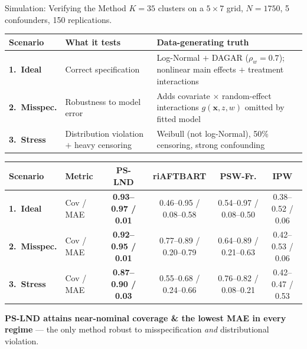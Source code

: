 \documentclass[final]{beamer}
\begin{document}
\begin{frame}[fragile]
\begin{columns}[T]
\begin{column}{0.355\textwidth}
\vspace{4pt}

\begin{methodbox}{Simulation: Verifying the Method}
$K\!=\!35$ clusters on a $5\!\times\!7$ grid, $N\!=\!1750$, 5 confounders, 150 replications.

\vspace{3pt}
\begin{tabularx}{\linewidth}{p{2cm} >{\raggedright\arraybackslash}X >{\raggedright\arraybackslash}X}
\toprule
\textbf{Scenario} & \textbf{What it tests} & \textbf{Data-generating truth} \\
\midrule
\textbf{1.\ Ideal} & Correct specification & Log-Normal $+$ DAGAR ($\rho_w\!=\!0.7$); nonlinear main effects $+$ treatment interactions \\[2pt]
\textbf{2.\ Misspec.} & Robustness to model error & Adds covariate $\times$ random-effect interactions $g(\mathbf{x},z,w)$ omitted by fitted model \\[2pt]
\textbf{3.\ Stress} & Distribution violation $+$ heavy censoring & Weibull (not log-Normal), 50\% censoring, strong confounding \\
\bottomrule
\end{tabularx}

\vspace{4pt}
\begin{adjustbox}{width=\linewidth}
\renewcommand{\arraystretch}{1.15}
\begin{tabular}{ll >{\bfseries}c c c c}
\toprule
\textbf{Scenario} & \textbf{Metric} & \textbf{PS-LND} & riAFTBART & PSW-Fr. & IPW \\
\midrule
\textbf{1.\ Ideal} & Cov / MAE & \cellcolor{vlgreen}0.93--0.97 / 0.01 & 0.46--0.95 / 0.08--0.58 & 0.54--0.97 / 0.08--0.50 & 0.38--0.52 / 0.06 \\
\textbf{2.\ Misspec.} & Cov / MAE & \cellcolor{vlgreen}0.92--0.95 / 0.01 & 0.77--0.89 / 0.20--0.79 & 0.64--0.89 / 0.21--0.63 & 0.42--0.53 / 0.06 \\
\textbf{3.\ Stress} & Cov / MAE & \cellcolor{vlgreen}0.87--0.90 / 0.03 & 0.55--0.68 / 0.24--0.66 & 0.76--0.82 / 0.08--0.21 & 0.42--0.47 / 0.53 \\
\bottomrule
\end{tabular}
\end{adjustbox}

\vspace{3pt}
\begin{findingbox}
\centering
\textbf{PS-LND attains near-nominal coverage \& the lowest MAE in every regime} --- the only method robust to misspecification \emph{and} distributional violation.
\end{findingbox}
\end{methodbox}


\end{column}
\end{columns}
\end{frame}
\end{document}
